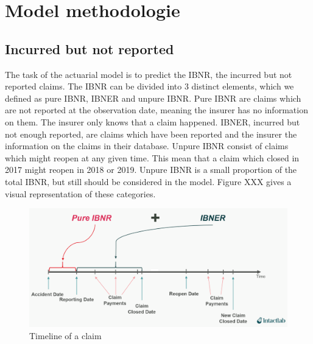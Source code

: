 \section{Model methodologie}\label{Sect_Methodologie}
\subsection{Incurred but not reported}
	The task of the actuarial model is to predict the IBNR, the incurred but not reported claims. The IBNR can be divided into 3 distinct elements, which we defined as pure IBNR, IBNER and unpure IBNR. Pure IBNR are claims which are not reported at the observation date, meaning the insurer has no information on them. The insurer only knows that a claim happened. IBNER, incurred but not enough reported, are claims which have been reported and the insurer the information on the claims in their database. Unpure IBNR consist of claims which might reopen at any given time. This mean that a claim which closed in 2017 might reopen in 2018 or 2019. Unpure IBNR is a small proportion of the total IBNR, but still should be considered in the model. Figure XXX gives a visual representation of these categories. 
	\begin{figure}[H]
		\begin{center}
			\includegraphics[scale=0.2]{Graphiques/IBNER_timeline} 
			\renewcommand{\figurename}{Figure}
			\caption{Timeline of a claim}\label{Fig_IBNER_timeline}
		\end{center}
	\end{figure}

